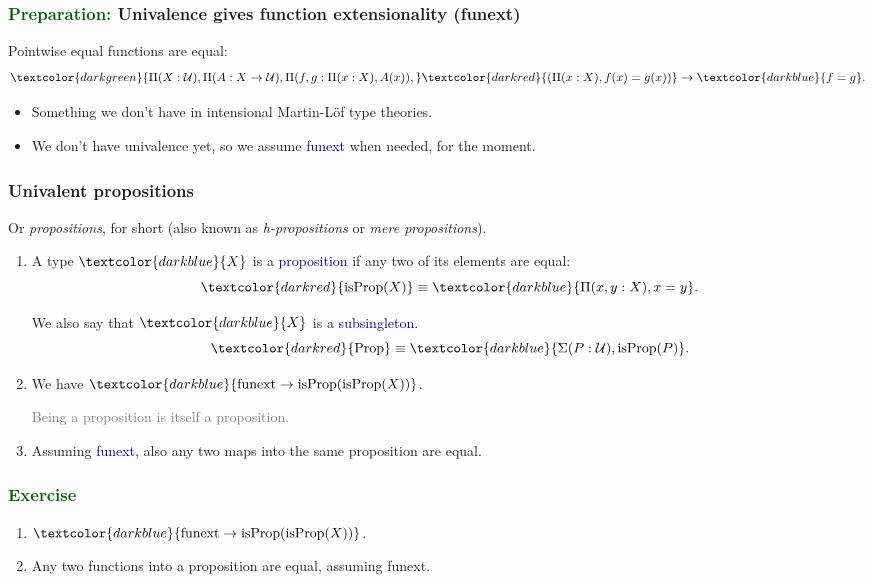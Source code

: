 \documentclass[aspectratio=169]{beamer}
\newcommand{\Prop}{\operatorname{Prop}}
\newcommand{\isProp}{\operatorname{isProp}}
\newcommand{\eqq}{\equiv}
\newcommand{\U}{\operatorname{\mathcal{U}}}
\newcommand{\db}{\textcolor{darkblue}}
\newcommand{\dg}{\textcolor{darkgreen}}
\newcommand{\grey}{\textcolor{grey}}
\newcommand{\dr}{\textcolor{darkred}}
\newcommand{\m}[1]{$\db{#1}$}
\newcommand{\MM}[1]{\[{#1}\]}
\begin{document}
 \begin{frame}
  \frametitle{\dg{Preparation:} Univalence gives function extensionality (funext)}

Pointwise equal functions are equal:
\[\dg{\Pi(X:\U), \Pi(A:X \to \U), \Pi(f,g:\Pi(x:X), A(x)),} \dr{(\Pi(x:X), f(x)=g(x))} \to \db{f=g}.\]

\begin{itemize}
\vfill \item 
Something we don't have in intensional Martin-L\"of type theories.
\vfill \item 
We don't have univalence yet, so we assume \db{funext} when needed, for the moment. 
\end{itemize}

\end{frame}

\begin{frame}
  \frametitle{Univalent propositions}

Or \emph{propositions}, for short (also known as \emph{h-propositions} or \emph{mere propositions}).

\vfill

  \begin{enumerate}
  \vfill \item A type \m{X} is a \db{proposition} if any two of its elements are equal: 
\MM{\dr{\isProp(X)} \eqq \db{\Pi(x,y:X), x=y}.}

\vfill

We also say that \m{X} is a \db{subsingleton}.
\MM{\dr{\Prop} \eqq \db{\Sigma(P:\U), \isProp(P)}.}

\vfill

  \vfill \item We have \m{\text{funext} \to \isProp(\isProp(X))}.

\vfill

  \grey{Being a proposition is itself a proposition.}

\vfill

\vfill \item Assuming \db{funext}, also any two maps into the same proposition are equal.

\end{enumerate}

\vfill

\end{frame}

\begin{frame} \frametitle{\dg{Exercise}}

  \begin{enumerate}
  \item  \m{\text{funext} \to \isProp(\isProp(X))}.
  \item Any two functions into a proposition are equal, assuming funext.
  \end{enumerate}

\end{frame}
\end{document}

